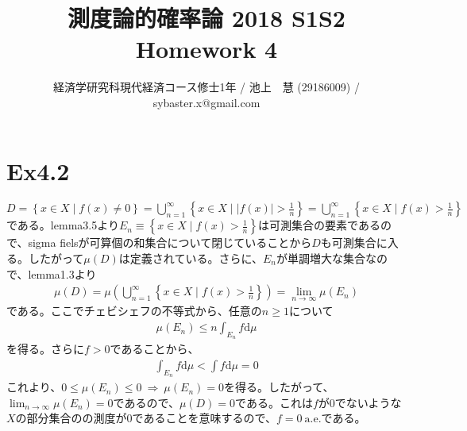 \documentclass{article}
\begin{document}
\title{測度論的確率論 2018 S1S2 \\ 
Homework 4}
\author{経済学研究科現代経済コース修士1年 / 池上　慧 (29186009) / sybaster.x@gmail.com}
\maketitle

\section{Ex4.2}
 $D = \left\{ x \in X \mid f(x) \neq 0 \right\} = \bigcup_{n = 1}^{\infty} \left\{ x\in X \mid |f(x)| > \frac{1}{n} \right\} = \bigcup_{n = 1}^{\infty} \left\{ x\in X \mid f(x) > \frac{1}{n} \right\}$
である。lemma3.5より$E_n \equiv \left\{ x\in X \mid f(x) > \frac{1}{n} \right\} $は可測集合の要素であるので、sigma fielsが可算個の和集合について閉じていることから$D$も可測集合に入る。したがって$\mu(D)$は定義されている。さらに、$E_n$が単調増大な集合なので、lemma1.3より
\begin{align*}
	\mu(D) = \mu \left(\bigcup_{n = 1}^{\infty} \left\{ x\in X \mid f(x) > \frac{1}{n} \right\}\right) = \lim_{n\to \infty} \mu(E_n)
\end{align*}
である。ここでチェビシェフの不等式から、任意の$n \geq 1$について
\begin{align*}
	\mu(E_n) \leq n \int_{E_n} f \mathrm{d}\mu
\end{align*}
を得る。さらに$f > 0$であることから、
\begin{align*}
	\int_{E_n} f \mathrm{d}\mu < \int f \mathrm{d}\mu  = 0
\end{align*}
これより、$0\leq \mu(E_n) \leq 0 \ \Rightarrow\ \mu(E_n) = 0$を得る。したがって、$\lim_{n\to \infty} \mu(E_n) = 0$であるので、$\mu(D) = 0$である。これは$f$が$0$でないような$X$の部分集合のの測度が$0$であることを意味するので、$f = 0\ \text{a.e.}$である。
\end{document}
